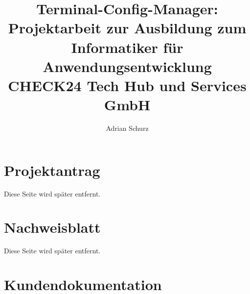 \documentclass[a4paper,11pt,draft=false,bibliography=totoc]{scrartcl} %
\author{Adrian Schurz}
\title{Terminal-Config-Manager:\\
	Projektarbeit zur Ausbildung zum Informatiker für Anwendungsentwicklung\\
	CHECK24 Tech Hub und Services GmbH\\
	}
\begin{document}

\titlehead{\centering\texttt{[image: header.png]}}
\maketitle
{}
\newpage

\section{Projektantrag}
\begin{center}
	Diese Seite wird später entfernt.
\end{center}


\section{Nachweisblatt}
\begin{center}
	Diese Seite wird später entfernt.
\end{center}


\newpage
\tableofcontents
\newpage






\section{Kundendokumentation} \label{Kundendokumentation}











\printbibliography

\printglossaries
\end{document}
